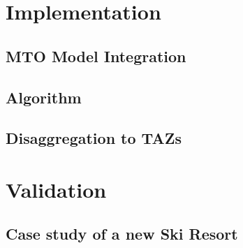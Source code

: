 \chapter{Implementation}
\label{section:implementation}
\section{MTO Model Integration}

\section{Algorithm}

\section{Disaggregation to TAZs}


\chapter{Validation}

\section{Case study of a new Ski Resort}